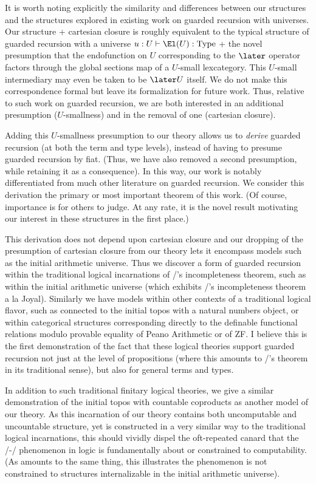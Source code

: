 It is worth noting explicitly the similarity and differences between our structures and the structures explored in existing work on guarded recursion with universes. Our structure + cartesian closure is roughly equivalent to the typical structure of guarded recursion with a universe $u : U \vdash \El(U) : \mathrm{Type}$ + the novel presumption that the endofunction on $U$ corresponding to the $\later$ operator factors through the global sections map of a $U$-small lexcategory. This $U$-small intermediary may even be taken to be $\later U$ itself. We do not make this correspondence formal but leave its formalization for future work. Thus, relative to such work on guarded recursion, we are both interested in an additional presumption ($U$-smallness) and in the removal of one (cartesian closure).

Adding this $U$-smallness presumption to our theory allows us to \emph{derive} guarded recursion (at both the term and type levels), instead of having to presume guarded recursion by fiat. (Thus, we have also removed a second presumption, while retaining it as a consequence). In this way, our work is notably differentiated from much other literature on guarded recursion. We consider this derivation the primary or most important theorem of this work. (Of course, importance is for others to judge. At any rate, it is the novel result motivating our interest in these structures in the first place.)

This derivation does not depend upon cartesian closure and our dropping of the presumption of cartesian closure from our theory lets it encompass models such as the initial arithmetic universe. Thus we discover a form of guarded recursion within the traditional logical incarnations of \Goedel/'s incompleteness theorem, such as within the initial arithmetic universe (which exhibits \Goedel/'s incompleteness theorem a la Joyal). Similarly we have models within other contexts of a traditional logical flavor, such as connected to the initial topos with a natural numbers object, or within categorical structures corresponding directly to the definable functional relations modulo provable equality of Peano Arithmetic or of ZF. I believe this is the first demonstration of the fact that these logical theories support guarded recursion not just at the level of propositions (where this amounts to \Loeb/'s theorem in its traditional sense), but also for general terms and types.

In addition to such traditional finitary logical theories, we give a similar demonstration of the initial topos with countable coproducts as another model of our theory. As this incarnation of our theory contains both uncomputable and uncountable structure, yet is constructed in a very similar way to the traditional logical incarnations, this should vividly dispel the oft-repeated canard that the \Godel/-\Lob/ phenomenon in logic is fundamentally about or constrained to computability. (As amounts to the same thing, this illustrates the phenomenon is not constrained to structures internalizable in the initial arithmetic universe).

